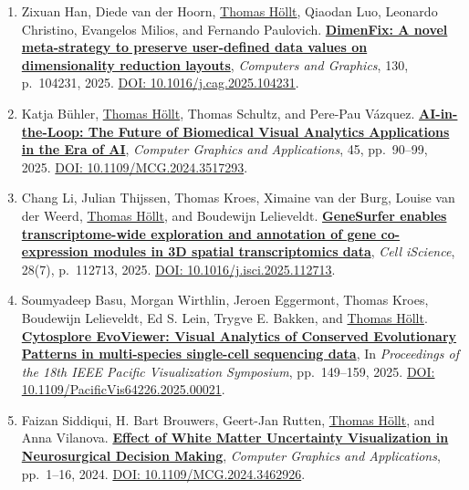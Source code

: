 \documentclass[10pt,a4paper,roman,final]{moderncv}
\newcommand*\highlightauthor[1]{\underline{#1}}
\begin{document}
\begin{enumerate}[leftmargin=0cm,start=2]
\item
Zixuan Han, Diede van der Hoorn, \highlightauthor{Thomas Höllt}, Qiaodan Luo, Leonardo Christino, Evangelos Milios, and Fernando Paulovich.
\href{https://www.thomashollt.com/publications/2025_dimenfix/}{\textbf{DimenFix: A novel meta-strategy to preserve user-defined data values on dimensionality reduction layouts}},
\emph{Computers and Graphics}, 130, p.~104231,
2025.
\href{https://doi.org/10.1016/j.cag.2025.104231}{DOI: 10.1016/\allowbreak j.cag.2025.104231}.


\item
Katja Bühler, \highlightauthor{Thomas Höllt}, Thomas Schultz, and Pere-Pau Vázquez.
\href{https://www.thomashollt.com/publications/2025_ai_in_the_loop/}{\textbf{AI-in-the-Loop: The Future of Biomedical Visual Analytics Applications in the Era of AI}},
\emph{Computer Graphics and Applications}, 45, pp.~90--99,
2025.
\href{https://doi.org/10.1109/MCG.2024.3517293}{DOI: 10.1109/\allowbreak MCG.2024.3517293}.


\item
Chang Li, Julian Thijssen, Thomas Kroes, Ximaine van der Burg, Louise van der Weerd, \highlightauthor{Thomas Höllt}, and Boudewijn Lelieveldt.
\href{https://www.thomashollt.com/publications/2025_genesurfer/}{\textbf{GeneSurfer enables transcriptome-wide exploration and annotation of gene co-expression modules in 3D spatial transcriptomics data}},
\emph{Cell iScience}, 28(7), p.~112713,
2025.
\href{https://doi.org/10.1016/j.isci.2025.112713}{DOI: 10.1016/\allowbreak j.isci.2025.112713}.


\item
Soumyadeep Basu, Morgan Wirthlin, Jeroen Eggermont, Thomas Kroes, Boudewijn Lelieveldt, Ed S. Lein, Trygve E. Bakken, and \highlightauthor{Thomas Höllt}.
\href{https://www.thomashollt.com/publications/2025_evoviewer/}{\textbf{Cytosplore EvoViewer: Visual Analytics of Conserved Evolutionary Patterns in multi-species single-cell sequencing data}},
In \emph{Proceedings of the 18th IEEE Pacific Visualization Symposium}, pp.~149--159,
2025.
\href{https://doi.org/10.1109/PacificVis64226.2025.00021}{DOI: 10.1109/\allowbreak PacificVis64226.2025.00021}.


\item
Faizan Siddiqui, H. Bart Brouwers, Geert-Jan Rutten, \highlightauthor{Thomas Höllt}, and Anna Vilanova.
\href{https://www.thomashollt.com/publications/2024_cga_faizan/}{\textbf{Effect of White Matter Uncertainty Visualization in Neurosurgical Decision Making}},
\emph{Computer Graphics and Applications}, pp.~1--16,
2024.
\href{https://doi.org/10.1109/MCG.2024.3462926}{DOI: 10.1109/\allowbreak MCG.2024.3462926}.



\end{enumerate}
\end{document}
